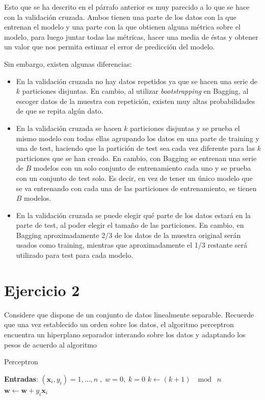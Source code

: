 \documentclass[11pt,a4paper]{article}
\newcommand{\addtoc}[1]{\addcontentsline{toc}{section}{#1}}
\begin{document}
Esto que se ha descrito en el párrafo anterior es muy parecido a lo que se hace con la validación cruzada. Ambos tienen una parte
de los datos con la que entrenan el modelo y una parte con la que obtienen alguna métrica sobre el modelo, para luego juntar todas
las métricas, hacer una media de éstas y obtener un valor que nos permita estimar el error de predicción del modelo.

Sin embargo, existen algunas diferencias:

\begin{itemize}[label=\textbullet]
	\item En la validación cruzada no hay datos repetidos ya que se hacen una serie de $k$ particiones disjuntas. En cambio, al
	utilizar \textit{bootstrapping} en Bagging, al escoger datos de la muestra con repetición, existen muy altas probabilidades
	de que se repita algún dato.
	\item En la validación cruzada se hacen $k$ particiones disjuntas y se prueba el mismo modelo con todas ellas agrupando
	los datos en una parte de training y una de test, haciendo que la partición de test sea cada vez diferente para las $k$
	particiones que se han creado. En cambio, con Bagging se entrenan una serie de $B$ modelos con un solo
	conjunto de entrenamiento cada uno y se prueba con un conjunto de test solo. Es decir, en vez de tener un único modelo que
	se va entrenando con cada una de las particiones de entrenamiento, se tienen $B$ modelos.
	\item En la validación cruzada se puede elegir qué parte de los datos estará en la parte de test, al poder elegir el tamaño
	de las particiones. En cambio, en Bagging aproximadamente 2/3 de los datos de la muestra original serán usados como training,
	mientras que aproximadamente el 1/3 restante será utilizado para test para cada modelo.
\end{itemize}

\section*{Ejercicio 2}
\addtoc{Ejercicio 2}

\noindent Considere que dispone de un conjunto de datos linealmente separable. Recuerde que una
vez establecido un orden sobre los datos, el algoritmo perceptron encuentra un hiperplano
separador interando sobre los datos y adaptando los pesos de acuerdo al algoritmo

\begin{algorithm}[H]
\caption{Perceptron}
\begin{algorithmic}[1]
\State \textbf{Entradas}: $(\mathbf{x}_i, y_i) = 1, \dots, n \; , \; w=0, \; k = 0$
\Repeat
	\State $k \gets (k + 1) \; \mod \; n$
		\State $\mathbf{w} \gets \mathbf{w} + y_i\mathbf{x}_i$
	\EndIf
{}
\end{algorithmic}
\end{algorithm}
\end{document}

